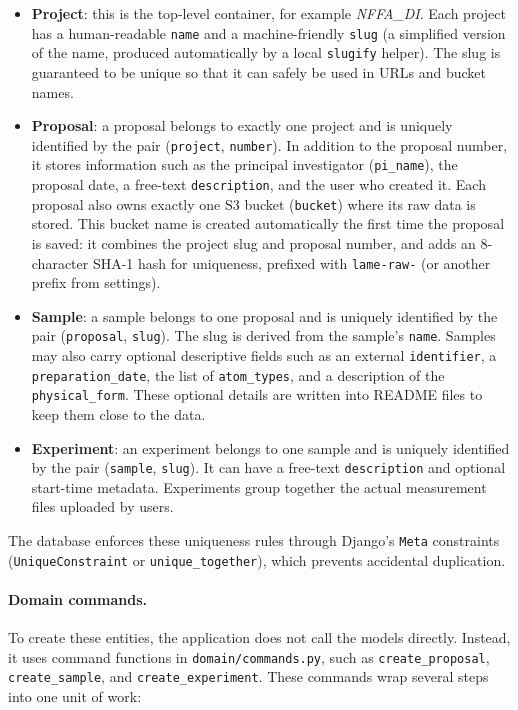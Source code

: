 \begin{itemize}
	\item \textbf{Project}: this is the top-level container, for example \emph{NFFA\_DI}. 
	Each project has a human-readable \texttt{name} and a machine-friendly \texttt{slug} 
	(a simplified version of the name, produced automatically by a local \texttt{slugify} helper). 
	The slug is guaranteed to be unique so that it can safely be used in URLs and bucket names.
	
	\item \textbf{Proposal}: a proposal belongs to exactly one project and is uniquely identified by the pair 
	(\texttt{project}, \texttt{number}). In addition to the proposal number, it stores information such as the 
	principal investigator (\texttt{pi\_name}), the proposal date, a free-text \texttt{description}, and the user who created it. 
	Each proposal also owns exactly one S3 bucket (\texttt{bucket}) where its raw data is stored. 
	This bucket name is created automatically the first time the proposal is saved: 
	it combines the project slug and proposal number, and adds an 8-character SHA-1 hash for uniqueness, 
	prefixed with \texttt{lame-raw-} (or another prefix from settings).
	
	\item \textbf{Sample}: a sample belongs to one proposal and is uniquely identified by the pair 
	(\texttt{proposal}, \texttt{slug}). The slug is derived from the sample’s \texttt{name}. 
	Samples may also carry optional descriptive fields such as an external \texttt{identifier}, 
	a \texttt{preparation\_date}, the list of \texttt{atom\_types}, and a description of the \texttt{physical\_form}. 
	These optional details are written into README files to keep them close to the data.
	
	\item \textbf{Experiment}: an experiment belongs to one sample and is uniquely identified by the pair 
	(\texttt{sample}, \texttt{slug}). It can have a free-text \texttt{description} and optional start-time metadata. 
	Experiments group together the actual measurement files uploaded by users.
\end{itemize}

The database enforces these uniqueness rules through Django’s \texttt{Meta} constraints (\texttt{UniqueConstraint} or 
\texttt{unique\_together}), which prevents accidental duplication.  

\paragraph{Domain commands.}
To create these entities, the application does not call the models directly.  
Instead, it uses command functions in \texttt{domain/commands.py}, such as \texttt{create\_proposal}, 
\texttt{create\_sample}, and \texttt{create\_experiment}.  
These commands wrap several steps into one unit of work:

